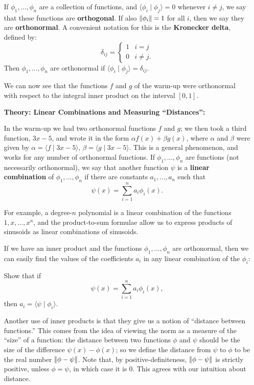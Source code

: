 \documentclass{article}
\newcommand{\norm}[1]{\left|\kern-1pt\left|#1\right|\kern-1pt\right|}
\begin{document}
If $\phi_1,\hdots,\phi_n$ are a collection of functions, and $\langle\phi_i\mid\phi_j\rangle=0$ whenever $i\neq j$, we say that these functions are \textbf{orthogonal}. If also $\norm{\phi_i}=1$ for all $i$, then we say they are \textbf{orthonormal}. A convenient notation for this is the \textbf{Kronecker delta}, defined by:
\[\delta_{ij}=\begin{cases} 1 & i=j\\ 0 & i\neq j. \end{cases}\]
Then $\phi_1,\hdots,\phi_n$ are orthonormal if $\langle\phi_i\mid\phi_j\rangle=\delta_{ij}$.\medskip

We can now see that the functions $f$ and $g$ of the warm-up were orthonormal with respect to the integral inner product on the interval $[0,1]$.


\clearpage












\textbf{Theory: Linear Combinations and Measuring ``Distances'':}\bigskip


In the warm-up we had two orthonormal functions $f$ and $g$; we then took a third function, $3x-5$, and wrote it in the form $\alpha f(x)+\beta g(x)$, where $\alpha$ and $\beta$ were given by $\alpha = \langle f\mid 3x-5\rangle$, $\beta=\langle g\mid 3x-5\rangle$. This is a general phenomenon, and works for any number of orthonormal functions. If $\phi_1,\hdots,\phi_n$ are functions (not necessarily orthonormal), we say that another function $\psi$ is a \textbf{linear combination} of $\phi_1,\hdots,\phi_n$ if there are constants $a_1,\hdots,a_n$ such that
\[\psi(x)=\sum_{i=1}^n a_i\phi_i(x).\]

For example, a degree-$n$ polynomial is a linear combination of the functions $1,x,\hdots,x^n$, and the product-to-sum formulae allow us to express products of sinusoids as linear combinations of sinusoids.

If we have an inner product and the functions $\phi_1,\hdots,\phi_n$ are orthonormal, then we can easily find the values of the coefficients $a_i$ in any linear combination of the $\phi_i$:\medskip

Show that if
\[\psi(x)=\sum_{i=1}^n a_i\phi_i(x),\]
then $a_i=\langle\psi\mid\phi_i\rangle$.


\vfill

Another use of inner products is that they give us a notion of ``distance between functions.'' This comes from the idea of viewing the norm as a measure of the ``size'' of a function: the distance between two functions $\phi$ and $\psi$ should be the size of the difference $\psi(x)-\phi(x)$; so we define the distance from $\psi$ to $\phi$ to be the real number $\norm{\phi-\psi}$. Note that, by positive-definiteness, $\norm{\phi-\psi}$ is strictly positive, unless $\phi=\psi$, in which case it is 0. This agrees with our intuition about distance.
\end{document}
